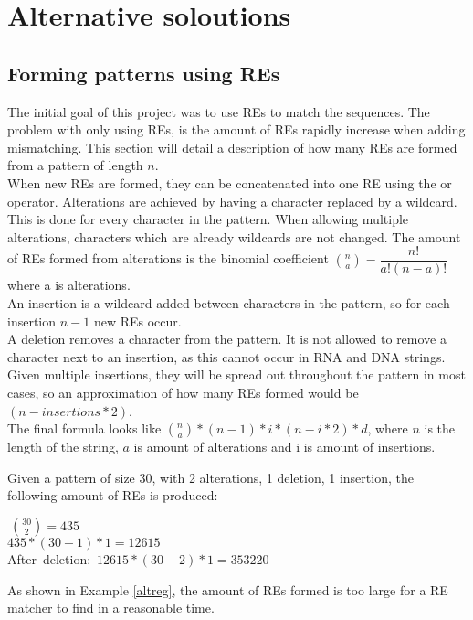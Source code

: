 \section{Alternative soloutions}
\subsection{Forming patterns using REs}
The initial goal of this project was to use REs to match the sequences. The problem with only using REs, is the amount of REs rapidly increase when adding mismatching. This section will detail a description of how many REs are formed from a pattern of length $n$.\\
When new REs are formed, they can be concatenated into one RE using the or operator. Alterations are achieved by having a character replaced by a wildcard. This is done for every character in the pattern. When allowing multiple alterations, characters which are already wildcards are not changed. The amount of REs formed from alterations is the binomial coefficient ${n \choose a}=\dfrac{n!}{a!(n-a)!}$ where a is alterations.\\
An insertion is a wildcard added between characters in the pattern, so for each insertion $n-1$ new REs occur. \\
A deletion removes a character from the pattern. It is not allowed to remove a character next to an insertion, as this cannot occur in RNA and DNA strings. Given multiple insertions, they will be spread out throughout the pattern in most cases, so an approximation of how many REs formed would be $(n - insertions * 2)$.\\
The final formula looks like ${n \choose a}*(n-1)*i*(n-i*2)*d$, where $n$ is the length of the string, $a$ is amount of alterations and i is amount of insertions.

\begin{myex}\label{altreg}
Given a pattern of size 30, with 2 alterations, 1 deletion, 1 insertion, the following amount of REs is produced: \\
\begin{center}
 $~{30 \choose 2} = 435$\\
 $435 * (30-1) * 1 = 12615$\\
After~deletion:~$12615*(30-2) * 1 = 353220$
\end{center}
\end{myex}

As shown in Example \ref{altreg}, the amount of REs formed is too large for a RE matcher to find in a reasonable time. 


